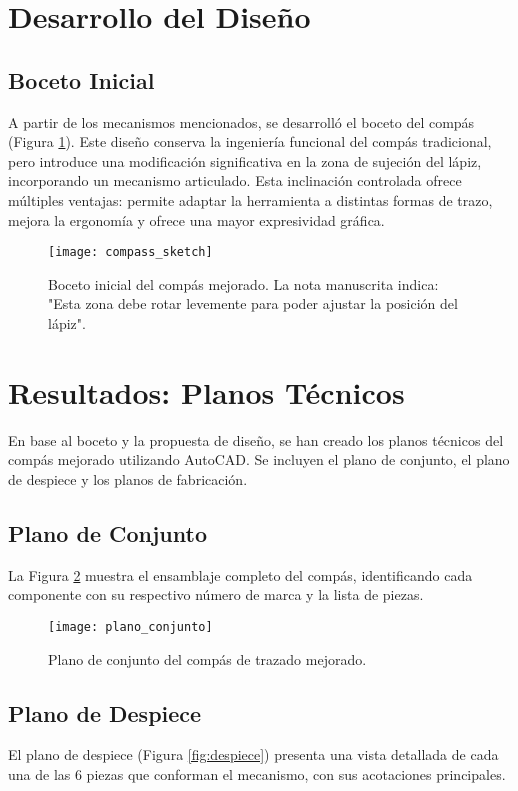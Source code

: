 \documentclass[11pt, a4paper]{article}
\begin{document}
\section{Desarrollo del Diseño}
\subsection{Boceto Inicial}
A partir de los mecanismos mencionados, se desarrolló el boceto del compás (Figura \ref{fig:boceto}). Este diseño conserva la ingeniería funcional del compás tradicional, pero introduce una modificación significativa en la zona de sujeción del lápiz, incorporando un mecanismo articulado.
Esta inclinación controlada ofrece múltiples ventajas: permite adaptar la herramienta a distintas formas de trazo, mejora la ergonomía y ofrece una mayor expresividad gráfica.

\begin{figure}[H]
    \centering
    \texttt{[image: compass\_sketch]}
    \caption{Boceto inicial del compás mejorado. La nota manuscrita indica: "Esta zona debe rotar levemente para poder ajustar la posición del lápiz".}
    \label{fig:boceto}
\end{figure}
\newpage

\section{Resultados: Planos Técnicos}
En base al boceto y la propuesta de diseño, se han creado los planos técnicos del compás mejorado utilizando AutoCAD. Se incluyen el plano de conjunto, el plano de despiece y los planos de fabricación.

\subsection{Plano de Conjunto}
La Figura \ref{fig:conjunto} muestra el ensamblaje completo del compás, identificando cada componente con su respectivo número de marca y la lista de piezas.

\begin{figure}[H]
    \centering
    \texttt{[image: plano\_conjunto]}
    \caption{Plano de conjunto del compás de trazado mejorado.}
    \label{fig:conjunto}
\end{figure}
\newpage

\subsection{Plano de Despiece}
El plano de despiece (Figura \ref{fig:despiece}) presenta una vista detallada de cada una de las 6 piezas que conforman el mecanismo, con sus acotaciones principales.
\end{document}

